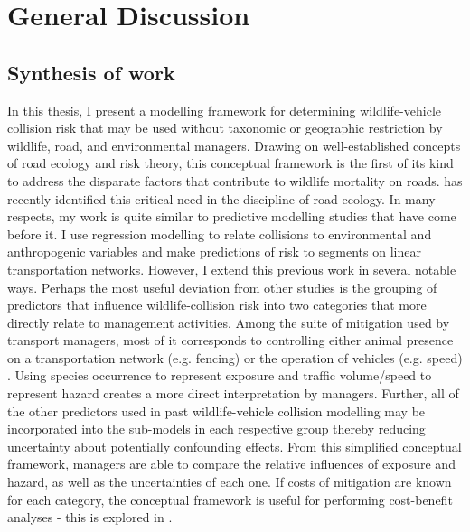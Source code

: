 \chapter{General Discussion}\label{sec:conc}
\newpage

\section{Synthesis of work}

In this thesis, I present a modelling framework for determining wildlife-vehicle collision risk that may be used without taxonomic or geographic restriction by wildlife, road, and environmental managers. Drawing on well-established concepts of road ecology and risk theory, this conceptual framework is the first of its kind to address the disparate factors that contribute to wildlife mortality on roads. \cite{clev15} has recently identified this critical need in the discipline of road ecology. In many respects, my work is quite similar to predictive modelling studies that have come before it. I use regression modelling to relate collisions to environmental and anthropogenic variables and make predictions of risk to segments on linear transportation networks. However, I extend this previous work in several notable ways. Perhaps the most useful deviation from other studies is the grouping of predictors that influence wildlife-collision risk into two categories that more directly relate to management activities. Among the suite of mitigation used by transport managers, most of it corresponds to controlling either animal presence on a transportation network (e.g. fencing) or the operation of vehicles (e.g. speed) \citep{glis09}.  Using species occurrence to represent exposure and traffic volume/speed to represent hazard creates a more direct interpretation by managers. Further, all of the other predictors used in past wildlife-vehicle collision modelling may be incorporated into the sub-models in each respective group thereby reducing uncertainty about potentially confounding effects. From this simplified conceptual framework, managers are able to compare the relative influences of exposure and hazard, as well as the uncertainties of each one. If costs of mitigation are known for each category, the conceptual framework is useful for performing cost-benefit analyses - this is explored in .

